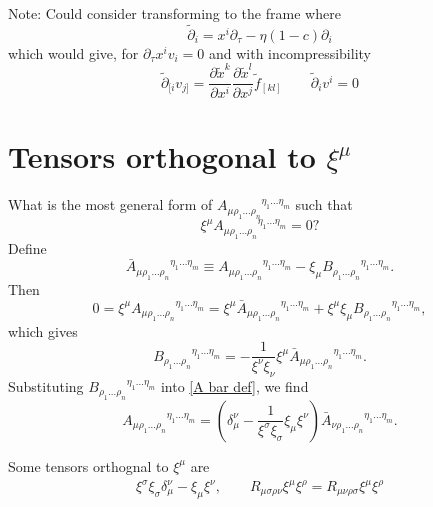 \documentclass[12pt,a4paper]{article}
\begin{document}
Note: Could consider transforming to the frame where
\begin{equation}
\tilde \partial_i		=		x^i \partial_\tau		-		\eta (1 - c) \partial_i
\end{equation}
which would give, for $\partial_\tau x^i v_i = 0$ and with incompressibility
\begin{equation}
\tilde \partial_{ [i } v_{ j] }		=		\frac{ \partial \tilde x^k }{ \partial x^i } \frac{ \partial \tilde x^l }{ \partial x^j } \tilde f_{ [kl] }
\qquad
\tilde \partial_i v^i		=		0
\end{equation}

\section{Tensors orthogonal to $\xi^\mu$}

What is the most general form of $A_{\mu \rho_1 \ldots \rho_n}{}^{\eta_1 \ldots \eta_m}$ such that
\begin{equation}
\xi^\mu A_{\mu \rho_1 \ldots \rho_n}{}^{\eta_1 \ldots \eta_m}		=		0?
\end{equation}
Define
\begin{equation}
\bar A_{\mu \rho_1 \ldots \rho_n}{}^{\eta_1 \ldots \eta_m}		\equiv		A_{\mu \rho_1 \ldots \rho_n}{}^{\eta_1 \ldots \eta_m}		-		\xi_\mu B_{\rho_1 \ldots \rho_n}{}^{\eta_1 \ldots \eta_m}.
\label{A bar def}
\end{equation}
Then
\begin{equation}
0		=		\xi^\mu A_{\mu \rho_1 \ldots \rho_n}{}^{\eta_1 \ldots \eta_m}		=		\xi^\mu \bar A_{\mu \rho_1 \ldots \rho_n}{}^{\eta_1 \ldots \eta_m}		+		\xi^\mu \xi_\mu B_{\rho_1 \ldots \rho_n}{}^{\eta_1 \ldots \eta_m},
\end{equation}
which gives
\begin{equation}
B_{\rho_1 \ldots \rho_n}{}^{\eta_1 \ldots \eta_m}		=		- \frac{ 1 }{\xi^\nu \xi_\nu} \xi^\mu \bar A_{\mu \rho_1 \ldots \rho_n}{}^{\eta_1 \ldots \eta_m}.
\end{equation}
Substituting $B_{\rho_1 \ldots \rho_n}{}^{\eta_1 \ldots \eta_m}$ into \eqref{A bar def}, we find
\begin{equation}
A_{\mu \rho_1 \ldots \rho_n}{}^{\eta_1 \ldots \eta_m}		=		\left(		\delta^\nu_\mu		-		\frac{ 1 }{\xi^\sigma \xi_\sigma} \xi_\mu \xi^\nu		\right)		\bar A_{\nu \rho_1 \ldots \rho_n}{}^{\eta_1 \ldots \eta_m}.
\end{equation}

Some tensors orthognal to $\xi^\mu$ are
\begin{gather}
\xi^\sigma \xi_\sigma \delta^\nu_\mu		-		\xi_\mu \xi^\nu,
\qquad
R_{\mu \sigma \rho \nu} \xi^\mu \xi^\rho		=		R_{\mu \nu \rho \sigma} \xi^\mu \xi^\rho
\end{gather}
\end{document}
